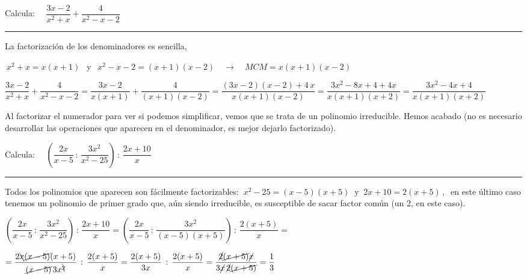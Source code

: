 \begin{miejercicio}

Calcula: $\quad \dfrac{3x-2}{x^2+x}+\dfrac{4}{x^2-x-2}$

\rule{250pt}{0.1pt}

La factorización de los denominadores es sencilla, 

$\ x^2+x=x(x+1)\ \ $ y $\ \ x^2-x-2=(x+1)(x-2) \quad \to \quad MCM=x(x+1)(x-2)$ 

\vspace{3mm}  $\dfrac{3x-2}{x^2+x}+\dfrac{4}{x^2-x-2}= \dfrac{3x-2}{x(x+1)}+\dfrac{4}{(x+1)(x-2)}=\dfrac{(3x-2)(x-2)+4\, x}{x(x+1)(x-2)}=\dfrac{3x^2-8x+4+4x}{x(x+1)(x+2)}=\dfrac{3x^2-4x+4}{x(x+1)(x+2)}$

\vspace{3mm} Al factorizar el numerador para ver si podemos simplificar, vemos que se trata de un polinomio irreducible. Hemos acabado (no es necesario desarrollar las operaciones que aparecen en el denominador, es mejor dejarlo factorizado).
	
\end{miejercicio}


\begin{miejercicio}

Calcula: $\quad \left( \dfrac{2x}{x-5}\, : \, \dfrac{3x^2}{x^2-25} \right) \, : \, \dfrac{2x+10}{x}$

\rule{250pt}{0.1pt}

Todos los polinomios que aparecen son fácilmente factorizables: $\ x^2-25=(x-5)(x+5)\ $ y $\ 2x+10=2(x+5)\, , \ $ en este último caso tenemos un polinomio de primer grado que, aún siendo irreducible, es susceptible de sacar factor común (un 2, en este caso).

\vspace{3mm} 
$ \left( \dfrac{2x}{x-5}\, : \, \dfrac{3x^2}{x^2-25} \right) \, : \, \dfrac{2x+10}{x}= \left( \dfrac{2x}{x-5} \, : \, \dfrac{3x^2}{(x-5)(x+5)} \right) \, : \, \dfrac{2(x+5)}{x}= $

\vspace{2mm} $=\dfrac{2\bcancel{x}\cancel{(x-5)}(x+5)}{\cancel{(x-5)}\, 3x^{\bcancel{2}}}\, : \,  \dfrac{2(x+5)}{x}= \dfrac{2(x+5)}{3x}\, : \,  \dfrac{2(x+5)}{x} = \dfrac{\cancel{2}\cancel{(x+5)}\cancel{x}}{3\cancel{x}\, \cancel{2}\cancel{(x+5)}}= \dfrac 1 3$
	
\end{miejercicio}


